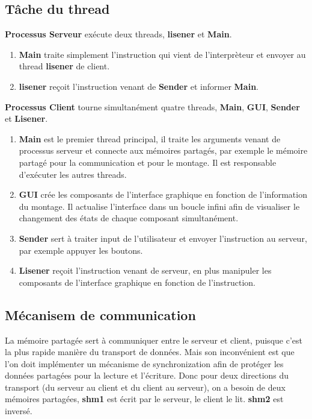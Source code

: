 \documentclass[14px]{article}
\begin{document}
\subsection{Tâche du thread}
\textbf{Processus Serveur} exécute deux threads, \textbf{lisener} et \textbf{Main}.
\begin{enumerate}
	\item \textbf{Main} traite simplement l'instruction qui vient de l'interprèteur et envoyer au thread \textbf{lisener} de client.
	\item \textbf{lisener} reçoit l'instruction venant de \textbf{Sender} et informer \textbf{Main}.
\end{enumerate}

\textbf{Processus Client} tourne simultanément quatre threads, \textbf{Main}, \textbf{GUI}, \textbf{Sender} et \textbf{Lisener}.
\begin{enumerate}
	\item \textbf{Main} est le premier thread principal, il traite les arguments venant de processus serveur et connecte aux mémoires partagés, par exemple le mémoire partagé pour la communication et pour le montage. Il est responsable d'exécuter les autres threads.
	\item \textbf{GUI} crée les composants de l'interface graphique en fonction de l'information du montage. Il actualise l'interface dans un boucle infini afin de visualiser le changement des états de chaque composant simultanément.
	\item \textbf{Sender} sert à traiter input de l'utilisateur et envoyer l'instruction au serveur, par exemple appuyer les boutons.
	\item \textbf{Lisener} reçoit l'instruction venant de serveur, en plus manipuler les composants de l'interface graphique en fonction de l'instruction.
\end{enumerate}

\clearpage

\subsection{Mécanisem de communication}
La mémoire partagée sert à communiquer entre le serveur et client, puisque c'est la plus rapide manière du transport de données. Mais son inconvénient est que l'on doit implémenter un mécanisme de synchronization afin de protéger les données partagées pour la lecture et l'écriture. Donc pour deux directions du transport (du serveur au client et du client au serveur), on a besoin de deux mémoires partagées, \textbf{shm1} est écrit par le serveur, le client le lit. \textbf{shm2} est inversé.\\
\end{document}
